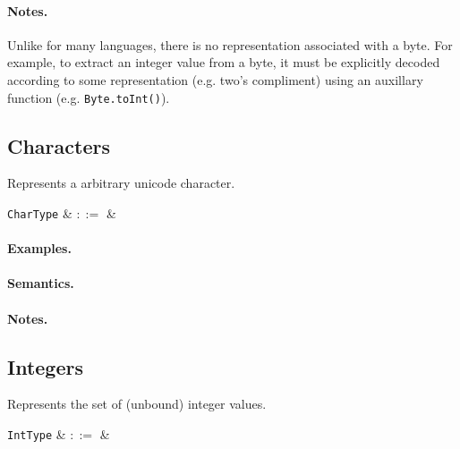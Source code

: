 \paragraph{Notes.}  Unlike for many languages, there is no
representation associated with a byte. For example, to extract an
integer value from a byte, it must be explicitly decoded according to
some representation (e.g. two's compliment) using an auxillary function (e.g. \lstinline{Byte.toInt()}).



\subsection{Characters}

Represents a arbitrary unicode character.

\begin{syntax}
  \verb+CharType+ & $::=$ &  \\
\end{syntax}

\paragraph{Examples.}

\paragraph{Semantics.}

\paragraph{Notes.} 


\subsection{Integers}

Represents the set of (unbound) integer values. 

\begin{syntax}
  \verb+IntType+ & $::=$ &  \\
\end{syntax}

